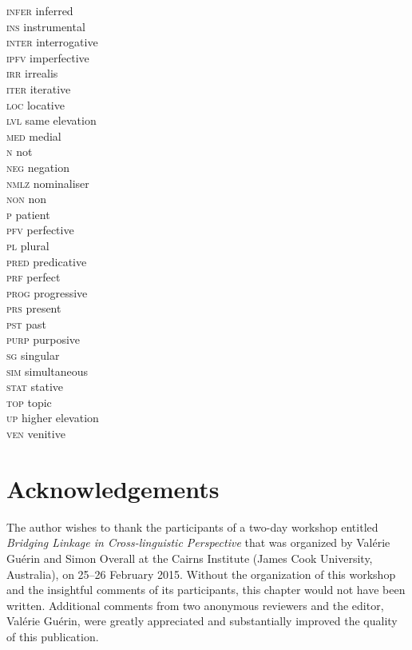\documentclass[output=paper]{LSP/langsci}
\begin{document}
\begin{multicols}{3}
\begin{tabbing}
\textsc{infer} \> inferred\\
\textsc{ins} \> instrumental\\
\textsc{inter} \> interrogative\\
\textsc{ipfv} \> imperfective\\
\textsc{irr} \> irrealis\\
\textsc{iter} \> iterative\\
\textsc{loc} \> locative\\
\textsc{lvl} \> same elevation\\
\textsc{med} \> medial\\
\textsc{n} \> not\\
\textsc{neg} \> negation\\
\textsc{nmlz} \> nominaliser\\
\textsc{non} \> non\\
\textsc{p} \> patient\\
\textsc{pfv} \> perfective\\
\textsc{pl} \> plural\\
\textsc{pred} \> predicative\\
\textsc{prf} \> perfect\\
\textsc{prog} \> progressive\\
\textsc{prs} \> present\\
\textsc{pst} \> past\\
\textsc{purp} \> purposive\\
\textsc{sg} \> singular\\
\textsc{sim} \> simultaneous\\
\textsc{stat} \> stative\\
\textsc{top} \> topic\\
\textsc{up} \> higher elevation\\
\textsc{ven} \> venitive\\
\end{tabbing}
\end{multicols}

\section*{Acknowledgements}
The author wishes to thank the participants of a two-day workshop entitled \textit{Bridging Linkage in Cross-linguistic Perspective} that was organized by Valérie Guérin and Simon Overall at the Cairns Institute (James Cook University, Australia), on 25--26 February 2015. Without the organization of this workshop and the insightful comments of its participants, this chapter would not have been written. Additional comments from two anonymous reviewers and the editor, Valérie Guérin, were greatly appreciated and substantially improved the quality of this publication.

\sloppy

\printbibliography[heading=subbibliography,notkeyword=this] 
\end{document}
